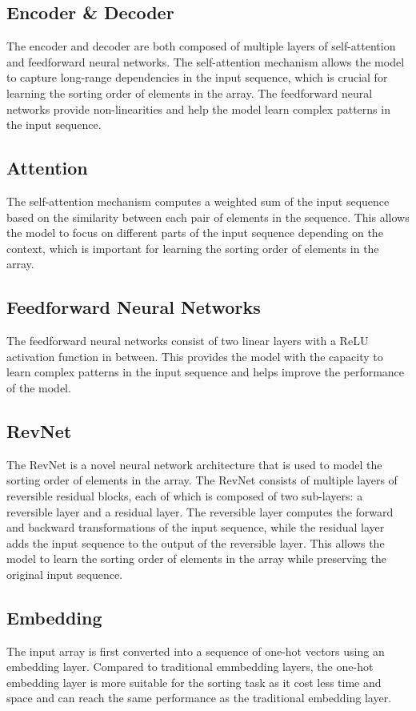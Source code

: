 \documentclass{article}
\begin{document}
\subsection{Encoder \& Decoder}
The encoder and decoder are both composed of multiple layers of self-attention and feedforward neural networks. The self-attention mechanism allows the model to capture long-range dependencies in the input sequence, which is crucial for learning the sorting order of elements in the array. The feedforward neural networks provide non-linearities and help the model learn complex patterns in the input sequence.

\subsection{Attention}
The self-attention mechanism computes a weighted sum of the input sequence based on the similarity between each pair of elements in the sequence. This allows the model to focus on different parts of the input sequence depending on the context, which is important for learning the sorting order of elements in the array.

\subsection{Feedforward Neural Networks}
The feedforward neural networks consist of two linear layers with a ReLU activation function in between. This provides the model with the capacity to learn complex patterns in the input sequence and helps improve the performance of the model.

\subsection{RevNet}
The RevNet is a novel neural network architecture that is used to model the sorting order of elements in the array. The RevNet consists of multiple layers of reversible residual blocks, each of which is composed of two sub-layers\cite{theefficienttransformer}: a reversible layer and a residual layer. The reversible layer computes the forward and backward transformations of the input sequence, while the residual layer adds the input sequence to the output of the reversible layer. This allows the model to learn the sorting order of elements in the array while preserving the original input sequence.

\subsection{Embedding}
The input array is first converted into a sequence of one-hot vectors using an embedding layer.\cite{TransfomerPrograming} Compared to traditional emmbedding layers, the one-hot embedding layer is more suitable for the sorting task as it cost less time and space and can reach the same performance as the traditional embedding layer.
\end{document}
